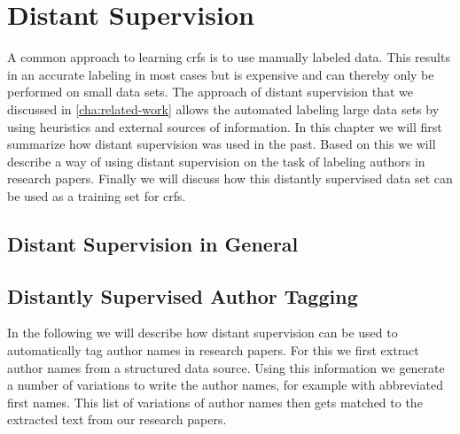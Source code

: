 \chapter{Distant Supervision}\label{cha:distant-supervision}

A common approach to learning \glspl{crf} is to use manually labeled data.
This results in an accurate labeling in most cases but is expensive and can thereby only be performed on small data sets.
The approach of \gls{distant supervision} that we discussed in \cref{cha:related-work} allows the automated labeling large data sets by using heuristics and external sources of information.
In this chapter we will first summarize how \gls{distant supervision} was used in the past. Based on this we will describe a way of using \gls{distant supervision} on the task of labeling authors in research papers. Finally we will discuss how this distantly supervised data set can be used as a training set for \glspl{crf}.

\bigskip

%

\section{Distant Supervision in General}
\section{Distantly Supervised Author Tagging}

In the following we will describe how distant supervision can be used to automatically tag author names in research papers.
For this we first extract author names from a structured data source.
Using this information we generate a number of variations to write the author names, for example with abbreviated first names.
This list of variations of author names then gets matched to the extracted text from our research papers.

